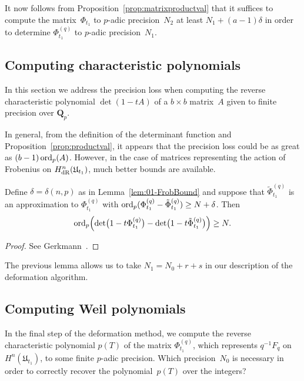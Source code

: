 It now follows from Proposition~\ref{prop:matrixproductval} that 
it suffices to compute the matrix~$\Phi_{t_1}$ to $p$-adic precision~$N_2$ 
at least \mbox{$N_1 + (a-1) \delta$} in order to determine $\Phi_{t_1}^{(q)}$ 
to $p$-adic precision~$N_1$.

\subsection{Computing characteristic polynomials}

In this section we address the precision loss when computing the reverse 
characteristic polynomial $\det(1 - t A)$ of a $b \times b$ matrix~$A$ 
given to finite precision over $\mathbf{Q}_p$.

In general, from the definition of the determinant function and 
Proposition~\ref{prop:productval}, it appears that the precision 
loss could be as great as $(b-1) \operatorname{ord}_p(A)$.  However, in the case 
of matrices representing the action of Frobenius 
on $H_{\text{dR}}^n(\mathfrak{U}_{t_1})$, much better bounds are available.

\begin{lem} \label{lem:charpoly}
Define $\delta = \delta(n,p)$ as in Lemma~\ref{lem:01-FrobBound} and 
suppose that $\tilde{\Phi}_{t_1}^{(q)}$ is an approximation to 
$\Phi_{t_1}^{(q)}$ with 
$\operatorname{ord}_p(\Phi_{t_1}^{(q)}-\tilde{\Phi}_{t_1}^{(q)}) \geq N + \delta$.  
Then 
\begin{equation*}
\operatorname{ord}_p \Bigl( \det\bigl(1 - t \Phi_{t_1}^{(q)}\bigr) 
            - \det\bigl(1 - t \tilde{\Phi}_{t_1}^{(q)}\bigr) \Bigr) \geq N.
\end{equation*}
\end{lem}

\begin{proof} 
See Gerkmann~\citep[Lemma~3.3, Lemma~3.4]{Gerkmann2007}.
\end{proof}

The previous lemma allows us to take 
$N_1 = N_0 + r + s$ in our description of the deformation 
algorithm.

\subsection{Computing Weil polynomials}

In the final step of the deformation method, we compute the 
reverse characteristic polynomial $p(T)$ of the matrix $\Phi_{t_1}^{(q)}$, 
which represents $q^{-1} F_q$ on $H^n(\mathfrak{U}_{t_1})$, to some finite 
$p$-adic precision.  Which precision~$N_0$ is necessary in order to 
correctly recover the polynomial~$p(T)$ over the integers?

